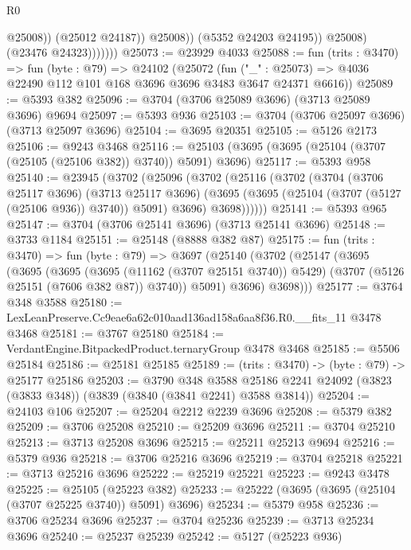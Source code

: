 \begin{lexlean}{R0}
\begin{coremodule}
                              @25008))
                          (@25012 @24187))
                        @25008))
                    (@5352 @24203 @24195))
                  @25008)
                (@23476 @24323)))))))
@25073 := @23929 @4033
@25088 := fun (trits : @3470) =>
  fun (byte : @79) =>
  @24102
    (@25072
      (fun ("_" : @25073) => @4036 @22490 @112 @101 @168 @3696 @3696 @3483 @3647 @24371 @6616))
@25089 := @5393 @382
@25096 := @3704 (@3706 @25089 @3696) (@3713 @25089 @3696) @9694
@25097 := @5393 @936
@25103 := @3704 (@3706 @25097 @3696) (@3713 @25097 @3696)
@25104 := @3695 @20351
@25105 := @5126 @2173
@25106 := @9243 @3468
@25116 := @25103 (@3695 (@3695 (@25104 (@3707 (@25105 (@25106 @382)) @3740)) @5091) @3696)
@25117 := @5393 @958
@25140 := @23945
    (@3702
      (@25096
        (@3702
          (@25116
            (@3702
              (@3704
                (@3706 @25117 @3696)
                (@3713 @25117 @3696)
                (@3695 (@3695 (@25104 (@3707 (@5127 (@25106 @936)) @3740)) @5091) @3696)
                @3698))))))
@25141 := @5393 @965
@25147 := @3704 (@3706 @25141 @3696) (@3713 @25141 @3696)
@25148 := @3733 @1184
@25151 := @25148 (@8888 @382 @87)
@25175 := fun (trits : @3470) =>
  fun (byte : @79) =>
  @3697
    (@25140
      (@3702
        (@25147
          (@3695
            (@3695
              (@3695
                (@3695 (@11162 (@3707 @25151 @3740)) @5429)
                (@3707 (@5126 @25151 (@7606 @382 @87)) @3740))
              @5091)
            @3696)
          @3698)))
@25177 := @3764 @348 @3588
@25180 := LexLeanPreserve.Cc9eae6a62c010aad136ad158a6aa8f36.R0.__fits_11 @3478 @3468
@25181 := @3767 @25180
@25184 := VerdantEngine.BitpackedProduct.ternaryGroup @3478 @3468
@25185 := @5506 @25184
@25186 := @25181 @25185
@25189 := (trits : @3470) -> (byte : @79) -> @25177 @25186
@25203 := @3790
    @348
    @3588
    @25186
    @2241
    @24092
    (@3823 (@3833 @348))
    (@3839 (@3840 (@3841 @2241) @3588 @3814))
@25204 := @24103 @106
@25207 := @25204 @2212 @2239 @3696
@25208 := @5379 @382
@25209 := @3706 @25208
@25210 := @25209 @3696
@25211 := @3704 @25210
@25213 := @3713 @25208 @3696
@25215 := @25211 @25213 @9694
@25216 := @5379 @936
@25218 := @3706 @25216 @3696
@25219 := @3704 @25218
@25221 := @3713 @25216 @3696
@25222 := @25219 @25221
@25223 := @9243 @3478
@25225 := @25105 (@25223 @382)
@25233 := @25222 (@3695 (@3695 (@25104 (@3707 @25225 @3740)) @5091) @3696)
@25234 := @5379 @958
@25236 := @3706 @25234 @3696
@25237 := @3704 @25236
@25239 := @3713 @25234 @3696
@25240 := @25237 @25239
@25242 := @5127 (@25223 @936)

\end{coremodule}
\end{lexlean}
